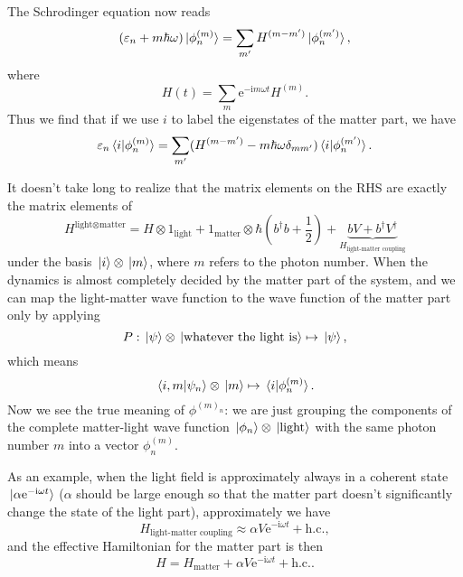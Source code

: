 \documentclass[hyperref, a4paper]{article}
\newcommand*{\ii}{\mathrm{i}}
\newcommand*{\ee}{\mathrm{e}}
\begin{document}
The Schrodinger equation now reads 
\begin{equation}
    (\varepsilon_n + m \hbar \omega) \ket*{\phi_n^{(m)}} 
    = \sum_{m'} H^{(m - m')} \ket*{\phi_n^{(m')}},
\end{equation}
where 
\begin{equation}
    H(t) = \sum_{m} \ee^{- \ii m \omega t} H^{(m)}.
\end{equation}
Thus we find that if we use $i$ to label the eigenstates of the matter part, 
we have 
\begin{equation}
    \varepsilon_n \braket*{i}{\phi^{(m)}_n}
    = \sum_{m'} (
        H^{(m - m')} - m \hbar \omega \delta_{m m'}
    ) \braket*{i}{\phi^{(m')}_{n}}.
    \label{eq:floquet-ham}
\end{equation}

It doesn't take long to realize that the matrix elements on the RHS 
are exactly the matrix elements of 
\begin{equation}
    H^{\text{light$\otimes$matter}} = 
    H \otimes 1_{\text{light}} + 1_{\text{matter}} \otimes \hbar \left(
        b^\dagger b + \frac{1}{2} 
    \right) 
    + \underbrace{
        b V + b^\dagger V^\dagger  
    }_{H_{\text{light-matter coupling}}} 
\end{equation}
under the basis $\ket*{i} \otimes \ket*{m}$,
where $m$ refers to the photon number. 
When the dynamics is almost completely decided by the matter part of the system,
and we can map the light-matter wave function 
to the wave function of the matter part only by applying 
\begin{equation}
    P: \ket*{\psi} \otimes \ket*{\text{whatever the light is}} \mapsto \ket*{\psi},
    \label{eq:from-extended-to-matter}
\end{equation} 
which means 
\begin{equation}
    \braket*{i, m}{\psi_n} \otimes \ket*{m} \mapsto \braket*{i}{\phi^{(m)}_n}.
\end{equation}
Now we see the true meaning of $\phi^{(m)_n}$:
we are just grouping the components of the complete matter-light wave function 
$\ket*{\phi_n} \otimes \ket*{\text{light}}$
with the same photon number $m$
into a vector $\phi_n^{(m)}$.

As an example, when the light field is approximately always in a coherent state
$\ket*{\alpha \ee^{- \ii \omega t}}$
($\alpha$ should be large enough so that the matter part 
doesn't significantly change the state of the light part), 
approximately we have 
\begin{equation}
    H_{\text{light-matter coupling}} \approx
    \alpha V \ee^{- \ii \omega t} + \text{h.c.},
\end{equation}
and the effective Hamiltonian for the matter part is then  
\begin{equation}
    H = H_{\text{matter}} + \alpha V \ee^{- \ii \omega t} + \text{h.c.}.
\end{equation}
\end{document}
